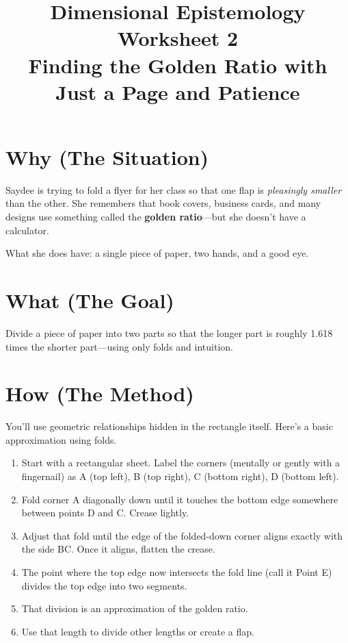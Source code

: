 \documentclass[11pt]{article}
\title{\vspace{-2cm}Dimensional Epistemology Worksheet 2\\
\Large{Finding the Golden Ratio with Just a Page and Patience}}
\date{}
\author{}
\begin{document}
\maketitle

\section*{Why (The Situation)}

Saydee is trying to fold a flyer for her class so that one flap is \textit{pleasingly smaller} than the other. She remembers that book covers, business cards, and many designs use something called the \textbf{golden ratio}—but she doesn’t have a calculator.

What she does have: a single piece of paper, two hands, and a good eye.

\section*{What (The Goal)}

Divide a piece of paper into two parts so that the longer part is roughly 1.618 times the shorter part—using only folds and intuition.

\section*{How (The Method)}

You’ll use geometric relationships hidden in the rectangle itself. Here’s a basic approximation using folds.

\begin{enumerate}[leftmargin=*, label=\textbf{Step \arabic*.}]
    \item Start with a rectangular sheet. Label the corners (mentally or gently with a fingernail) as A (top left), B (top right), C (bottom right), D (bottom left).

    \item Fold corner A diagonally down until it touches the bottom edge somewhere between points D and C. Crease lightly.

    \item Adjust that fold until the edge of the folded-down corner aligns exactly with the side BC. Once it aligns, flatten the crease.

    \item The point where the top edge now intersects the fold line (call it Point E) divides the top edge into two segments.

    \item That division is an approximation of the golden ratio.

    \item Use that length to divide other lengths or create a flap.
\end{enumerate}
\end{document}
